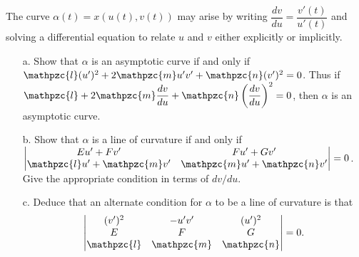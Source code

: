 \documentclass[Shifrin_Solutions_Spring_2018]{subfiles}
\begin{document}
\begin{exercise}
The curve $\alpha(t) = x(u(t), v(t))$ may arise by writing $\dfrac{dv}{du} = \dfrac{v'(t)}{u'(t)}$ and solving a differential equation to relate $u$ and $v$ either explicitly or implicitly.
\begin{itemize}
\item[a.] Show that $\alpha$ is an asymptotic curve if and only if $\mathpzc{l}(u')^2 + 2\mathpzc{m}u' v' + \mathpzc{n}(v')^2 = 0$. Thus if $\mathpzc{l} + 2\mathpzc{m}\dfrac{dv}{du} + \mathpzc{n}\left(\dfrac{dv}{du}\right)^2 = 0$, then $\alpha$ is an asymptotic curve.

\item[b.] Show that $\alpha$ is a line of curvature if and only if $\begin{vmatrix}
Eu' + Fv' & Fu'+Gv' \\ \mathpzc{l}u' + \mathpzc{m}v' & \mathpzc{m}u' + \mathpzc{n}v'
\end{vmatrix} =0$. Give the appropriate condition in terms of $dv/du$.

\item[c.] Deduce that an alternate condition for $\alpha$ to be a line of curvature is that
\[
\begin{vmatrix}
(v')^2 & -u'v' & (u')^2 \\
E & F & G \\
\mathpzc{l} & \mathpzc{m}  & \mathpzc{n}
\end{vmatrix}
=0.
\]
\end{itemize}
\end{exercise}
\end{document}

